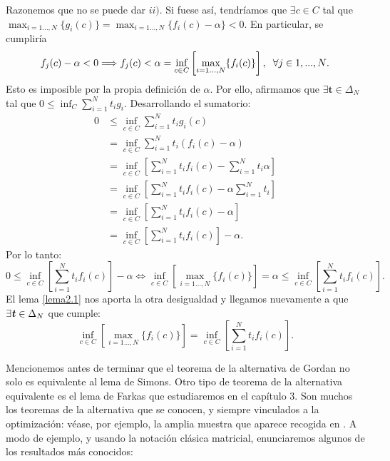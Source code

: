 Razonemos que no se puede dar $ ii) $. Si fuese así, tendríamos que $ \exists c \in C $ tal que $ \max_{i=1\dots,N } \{g_i(c)\} =  \max_{i=1\dots,N } \{f_i(c) - \alpha \} < 0 $. En particular, se cumpliría \[ f_j(c) - \alpha < 0 \Longrightarrow f_j(c) < \alpha = \inf_{ c\in C}\left[\max_{i=1\dots,N } \{f_i(c)\} \right],\hspace{2mm} \forall  j \in {1,...,N}. \] Esto es imposible por la propia definición de $ \alpha $. Por ello, afirmamos que $ \exists \mathbf{t} \in \Delta_N $ tal que $ 0 \leq \inf_{C}  \sum_{i=1}^{N}{t_i g_i}$. Desarrollando el sumatorio:
\begin{equation*}
\begin{split}
0 &\leq \inf_{c \in C}  \sum_{i=1}^{N}{t_i g_i (c)}\\
 &= \inf_{c \in C}  \sum_{i=1}^{N}{t_i(f_i(c) - \alpha)} \\
&= \inf_{c \in C} \left[ \sum_{i=1}^{N}{t_i f_i(c)} - \sum_{i=1}^{N}{t_i\alpha} \right]\\
&= \inf_{c \in C} \left[ \sum_{i=1}^{N}{t_i f_i(c)} -\alpha \sum_{i=1}^{N}{t_i} \right] \\ 
&= \inf_{c \in C} \left[ \sum_{i=1}^{N}{t_i f_i(c)} - \alpha \right] \\
&= \inf_{c \in C} \left[ \sum_{i=1}^{N}{t_i f_i(c)}\right] - \alpha.
\end{split}
\end{equation*}
Por lo tanto:
\[
0 \leq \inf_{c \in C} \left[ \sum_{i=1}^{N}{t_i f_i(c)}\right] - \alpha \Longleftrightarrow \inf_{c \in C}\left[ \max_{i=1\dots,N } \{f_i(c)\}\right] = \alpha  \leq \inf_{c \in C} \left[ \sum_{i=1}^{N}{t_i f_i(c)}\right].
\]
El lema \ref{lema2.1} nos aporta la otra desigualdad y llegamos nuevamente a que $ \exists \textbf{\emph{t}} \in \Delta_N $ que cumple:
\[
\inf_{c \in C}\left[ \max_{i=1\dots,N } \{f_i(c)\}\right] = \inf_{c \in C} \left[ \sum_{i=1}^{N}{t_i f_i(c)}\right]. \]
\hspace{12.2cm}\qedsymbol 

\bigskip

Mencionemos antes de terminar que el teorema de la alternativa de Gordan no solo es equivalente al lema de Simons. Otro tipo de teorema de la alternativa equivalente es el lema de Farkas que estudiaremos en el capítulo 3. Son muchos los teoremas de la alternativa que se conocen, y siempre vinculados a la optimización: véase, por ejemplo, la amplia muestra que aparece recogida en \cite{giorgi2004mathematics}. A modo de ejemplo, y usando la notación clásica matricial, enunciaremos algunos de los resultados más conocidos:

